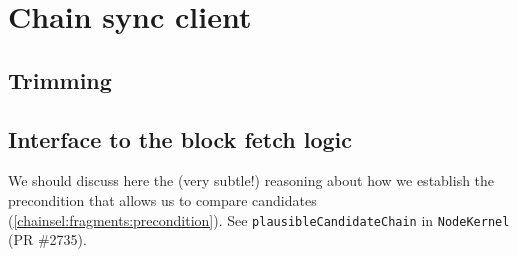 \chapter{Chain sync client}
\label{chainsyncclient}

\section{Trimming}
\label{chainsyncclient:trimming}

\section{Interface to the block fetch logic}
\label{chainsyncclient:plausiblecandidates}

We should discuss here the (very subtle!) reasoning about how we establish
the precondition that allows us to compare candidates
(\cref{chainsel:fragments:precondition}). See
\lstinline!plausibleCandidateChain! in \lstinline!NodeKernel!
(PR \#2735).
